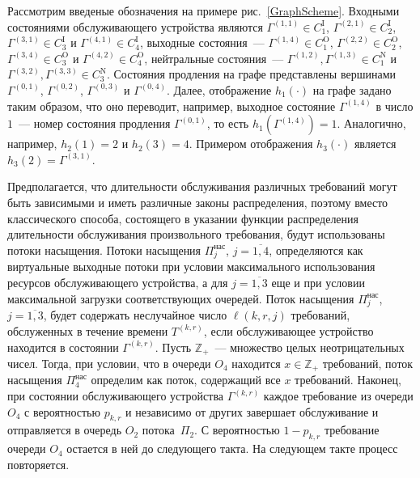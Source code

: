 \documentclass[a4paper,12pt,russian]{extarticle}
\begin{document}
Рассмотрим введеные обозначения на примере рис.~\ref{GraphScheme}. Входными состояниями обслуживающего устройства являются $\Gamma^{(1,1)} \in C_1^{\mathrm{I}}$, $\Gamma^{(2,1)} \in C_2^{\mathrm{I}}$, $\Gamma^{(3,1)} \in C_3^{\mathrm{I}}$ и $\Gamma^{(4,1)} \in C_4^{\mathrm{I}}$, выходные состояния~--- $\Gamma^{(1,4)} \in C_1^{\mathrm{O}}$, $\Gamma^{(2,2)} \in C_2^{\mathrm{O}}$, $\Gamma^{(3,4)} \in C_3^{\mathrm{O}}$ и $\Gamma^{(4,2)} \in C_4^{\mathrm{O}}$, нейтральные состояния~--- $\Gamma^{(1,2)}, \Gamma^{(1,3)} \in C_1^{\mathrm{N}}$ и $\Gamma^{(3,2)}, \Gamma^{(3,3)} \in C_3^{\mathrm{N}}$. Состояния продления на графе представлены вершинами $\Gamma^{(0,1)}$, $\Gamma^{(0,2)}$, $\Gamma^{(0,3)}$ и $\Gamma^{(0,4)}$. Далее, отображение $h_1(\cdot)$ на графе задано таким образом, что оно переводит, например, выходное состояние $\Gamma^{(1,4)}$ в число $1$~--- номер состояния продления $\Gamma^{(0,1)}$, то есть $h_1(\Gamma^{(1,4)})=1$. Аналогично, например, $h_2(1)=2$ и $h_2(3)=4$. Примером отображения $h_3(\cdot)$ является $h_3(2)=\Gamma^{(3,1)}$.


Предполагается, что длительности обслуживания различных требований могут быть зависимыми и иметь различные законы распределения, поэтому вместо классического способа, состоящего в указании функции распределения длительности обслуживания произвольного требования, будут использованы потоки насыщения. Потоки насыщения $\Pi^{\mathrm{\text{нас}}}_j$, $j=\overline{1,4}$, определяются как виртуальные выходные потоки при условии максимального использования ресурсов обслуживающего устройства, а для $j=\overline{1,3}$ еще и при условии максимальной загрузки соответствующих очередей. 
Поток насыщения $\Pi^{\mathrm{\text{нас}}}_j$, $j=\overline{1,3}$, будет содержать неслучайное число $\ell(k,r,j)$ требований, обслуженных в течение времени $T^{(k,r)}$, если обслуживающее устройство находится в состоянии $\Gamma^{(k,r)}$. Пусть $\mathbb{Z}_+$~--- множество целых неотрицательных чисел. Тогда, при условии, что в очереди $O_4$ находится $x \in \mathbb{Z}_+$ требований, поток насыщения $\Pi^{\mathrm{\text{нас}}}_4$ определим как поток, содержащий все $x$ требований.
Наконец, при состоянии обслуживающего устройства $\Gamma^{(k,r)}$ каждое требование из очереди $O_4$ с вероятностью $p_{k,r}$ и независимо от других завершает обслуживание и отправляется в очередь $O_2$ потока~$\Pi_2$. С вероятностью $1-p_{k,r}$ требование очереди $O_4$ остается в ней до следующего такта. На следующем такте процесс повторяется.
\end{document}
